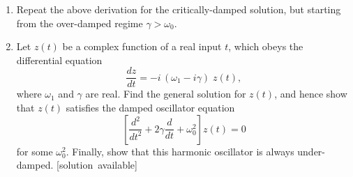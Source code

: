 \documentclass[10pt,a4paper]{article}
\begin{document}
\begin{enumerate}
\item
  Repeat the above derivation for the critically-damped solution, but
  starting from the over-damped regime $\gamma > \omega_0$.

\item
  Let $z(t)$ be a complex function of a real input $t$, which obeys
  the differential equation
  \begin{equation}
    \frac{dz}{dt} = -i\,(\omega_1 - i \gamma)\; z(t),
  \end{equation}
  where $\omega_1$ and $\gamma$ are real. Find the general solution
  for $z(t)$, and hence show that $z(t)$ satisfies the damped
  oscillator equation
  \begin{equation}
    \left[\frac{d^2}{dt^2} + 2\gamma \frac{d}{dt} + \omega_0^2 \right] z(t) = 0
  \end{equation}
  for some $\omega_0^2$. Finally, show that this harmonic oscillator
  is always under-damped.
  \vskip -0.05in
  \hfill{\scriptsize [solution~available]}
\end{enumerate}
\end{document}

